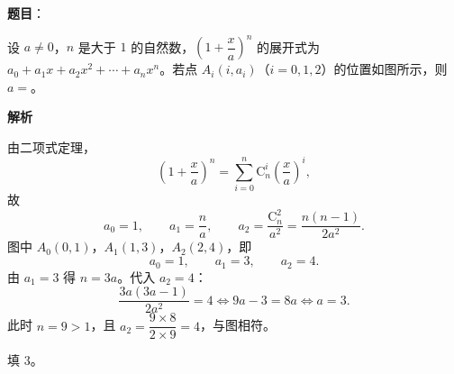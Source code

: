 \begin{answer}

\textbf{题目}：

设 $a\neq0$，$n$ 是大于 $1$ 的自然数，$\left(1+\dfrac xa\right)^n$ 的展开式为 $a_0+a_1x+a_2x^2+\cdots+a_nx^n$。若点 $A_i(i,a_i)$（$i=0,1,2$）的位置如图所示，则 $a=$\gkblank{}。
\nopagebreak[4]
\begin{center}\end{center}
\nopagebreak[4]
\textbf{解析}

由二项式定理，
\nopagebreak[4]
\[\left(1+\frac xa\right)^n=\sum_{i=0}^n \mathrm C_n^i\left(\frac xa\right)^i,\]
故
\nopagebreak[4]
\[a_0=1,\qquad a_1=\frac n a,\qquad a_2=\frac{\mathrm C_n^2}{a^2}=\frac{n(n-1)}{2a^2} .\]
图中 $A_0(0,1)$，$A_1(1,3)$，$A_2(2,4)$，即
\nopagebreak[4]
\[a_0=1,\qquad a_1=3,\qquad a_2=4 .\]
由 $a_1=3$ 得 $n=3a$。代入 $a_2=4$：
\nopagebreak[4]
\[\frac{3a(3a-1)}{2a^2}=4
\iff 9a-3=8a
\iff a=3 .\]
此时 $n=9>1$，且 $a_2=\dfrac{9\times8}{2\times9}=4$，与图相符。

填 $3$。


\end{answer}
